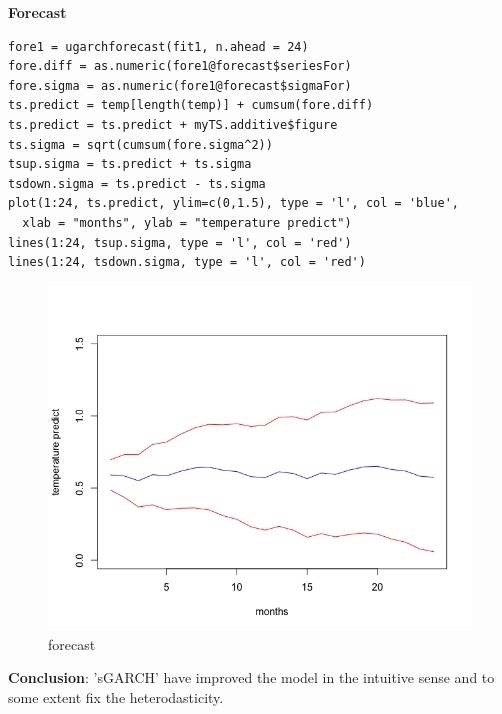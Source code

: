 \documentclass[a4paper, 11pt]{article}
\begin{document}
\textbf{Forecast}

\begin{verbatim}
fore1 = ugarchforecast(fit1, n.ahead = 24)
fore.diff = as.numeric(fore1@forecast$seriesFor)
fore.sigma = as.numeric(fore1@forecast$sigmaFor)
ts.predict = temp[length(temp)] + cumsum(fore.diff)
ts.predict = ts.predict + myTS.additive$figure
ts.sigma = sqrt(cumsum(fore.sigma^2))
tsup.sigma = ts.predict + ts.sigma
tsdown.sigma = ts.predict - ts.sigma
plot(1:24, ts.predict, ylim=c(0,1.5), type = 'l', col = 'blue',
  xlab = "months", ylab = "temperature predict")
lines(1:24, tsup.sigma, type = 'l', col = 'red')
lines(1:24, tsdown.sigma, type = 'l', col = 'red')
\end{verbatim}

\begin{figure}[H]
\centering
\caption{forecast}
\includegraphics[scale=.60]{predict01.png}
\end{figure}


\textbf{Conclusion}: 'sGARCH' have improved the model in the intuitive sense and to some extent fix the heterodasticity. 
\end{document}
